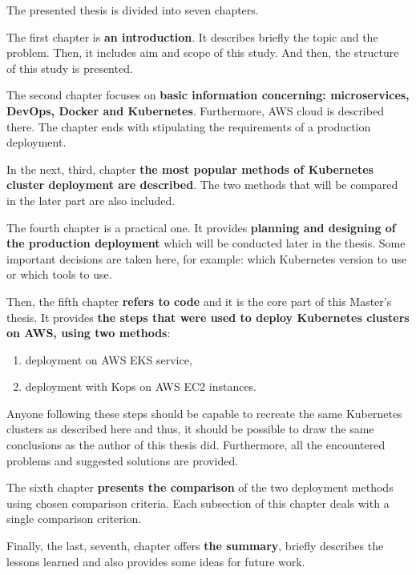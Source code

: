 The presented thesis is divided into seven chapters.

The first chapter is \textbf{an introduction}. It describes briefly the topic and the problem. Then, it includes aim and scope of this study. And then, the structure of this study is presented.

The second chapter focuses on \textbf{basic information concerning: microservices, DevOps, Docker and Kubernetes}. Furthermore, AWS cloud is described there. The chapter ends with stipulating the requirements of a production deployment.

In the next, third, chapter \textbf{the most popular methods of Kubernetes cluster deployment are described}. The two methods that will be compared in the later part are also included.

The fourth chapter is a practical one. It provides \textbf{planning and designing of the production deployment} which will be conducted later in the thesis. Some important decisions are taken here, for example: which Kubernetes version to use or which tools to use.

Then, the fifth chapter \textbf{refers to code} and it is the core part of this Master's thesis. It provides \textbf{the steps that were used to deploy Kubernetes clusters on AWS, using two methods}:
\begin{enumerate}
\item deployment on AWS EKS service,
\item deployment with Kops on AWS EC2 instances.
\end{enumerate}
Anyone following these steps should be capable to recreate the same Kubernetes clusters as described here and thus, it should be possible to draw the same conclusions as the author of this thesis did. Furthermore, all the encountered problems and suggested solutions are provided.

The sixth chapter \textbf{presents the comparison} of the two deployment methods using chosen comparison criteria. Each subsection of this chapter deals with a single comparison criterion.

Finally, the last, seventh, chapter offers \textbf{the summary}, briefly describes the lessons learned and also provides some ideas for future work.
